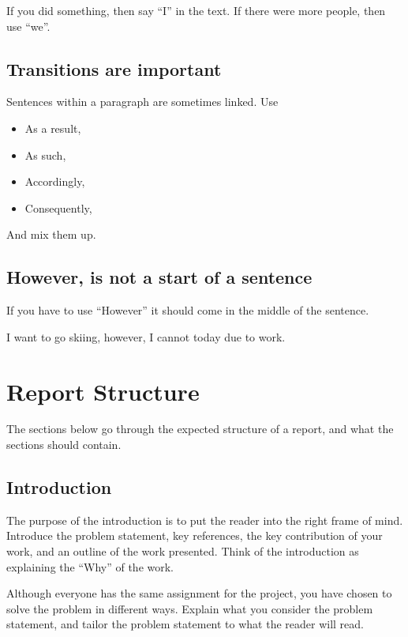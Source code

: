 If you did something, then say ``I'' in the text. If there were more
people, then use ``we''.

\subsection{Transitions are important}\label{transitions-are-important}

Sentences within a paragraph are sometimes linked. Use

\begin{itemize}
\tightlist
\item
  As a result,
\item
  As such,
\item
  Accordingly,
\item
  Consequently,
\end{itemize}

And mix them up.

\subsection{However, is not a start of a
sentence}\label{however-is-not-a-start-of-a-sentence}

If you have to use ``However'' it should come in the middle of the
sentence.

I want to go skiing, however, I cannot today due to work.

\section{Report Structure}\label{report-structure}

The sections below go through the expected structure of a report, and
what the sections should contain.

\subsection{Introduction}\label{introduction}

The purpose of the introduction is to put the reader into the right
frame of mind. Introduce the problem statement, key references, the key
contribution of your work, and an outline of the work presented. Think
of the introduction as explaining the ``Why'' of the work.

Although everyone has the same assignment for the project, you have
chosen to solve the problem in different ways. Explain what you consider
the problem statement, and tailor the problem statement to what the
reader will read.

